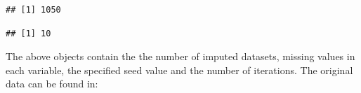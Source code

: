 \documentclass[]{book}
\newenvironment{Shaded}{\begin{snugshade}}{\end{snugshade}}
\newcommand{\OperatorTok}[1]{\textcolor[rgb]{0.81,0.36,0.00}{\textbf{#1}}}
\newcommand{\NormalTok}[1]{#1}
\begin{document}
\begin{verbatim}
## [1] 1050
\end{verbatim}

\begin{Shaded}
\end{Shaded}

\begin{verbatim}
## [1] 10
\end{verbatim}

The above objects contain the the number of imputed datasets, missing
values in each variable, the specified seed value and the number of
iterations. The original data can be found in:

\begin{Shaded}
\end{Shaded}
\end{document}
